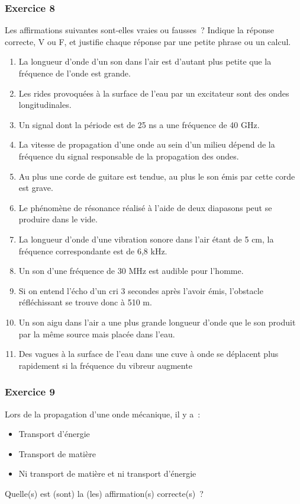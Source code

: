 \begin{multicols}{2}
\subsubsection*{Exercice 8}\label{exercice-son-8}

Les affirmations suivantes sont-elles vraies ou fausses~? Indique la
réponse correcte, V ou F, et justifie chaque réponse par une petite phrase ou 
un calcul.
\begin{enumerate}
\item
  La longueur d'onde d'un son dans l'air est d'autant plus petite que la
  fréquence de l'onde est grande.
\item
  Les rides provoquées à la surface de l'eau par un excitateur sont des
  ondes longitudinales.
\item
  Un signal dont la période est de 25 ns a une fréquence de 40 GHz.
\item
  La vitesse de propagation d'une onde au sein d'un milieu dépend de la
  fréquence du signal responsable de la propagation des ondes.
\item
  Au plus une corde de guitare est tendue, au plus le son émis par cette
  corde est grave.
\item
  Le phénomène de résonance réalisé à l'aide de deux diapasons peut se
  produire dans le vide.
\item
  La longueur d'onde d'une vibration sonore dans l'air étant de 5 cm, la
  fréquence correspondante est de 6,8 kHz.
\item
  Un son d'une fréquence de 30 MHz est audible pour l'homme.
\item
  Si on entend l'écho d'un cri 3 secondes après l'avoir émis, l'obstacle
  réfléchissant se trouve donc à 510 m.
\item
  Un son aigu dans l'air a une plus grande longueur d'onde que le son
  produit par la même source mais placée dans l'eau.
\item
  Des vagues à la surface de l'eau dans une cuve à onde se déplacent
  plus rapidement si la fréquence du vibreur augmente
\end{enumerate}

\subsubsection*{Exercice 9 }
\label{exercice-9-son}
Lors de la propagation d'une onde mécanique, il y a~: 
  \begin{itemize} 
       \item   Transport d'énergie
       \item   Transport de matière
       \item  Ni transport de matière et ni transport d'énergie
   \end{itemize}
Quelle(s) est (sont) la (les) affirmation(s) correcte(s)~?


\end{multicols}
